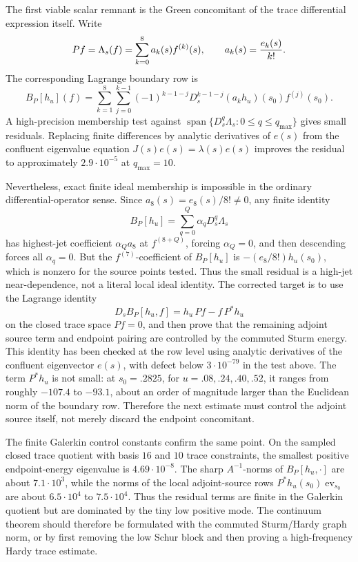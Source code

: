 \documentclass[11pt]{article}
\begin{document}
The first viable scalar remnant is the Green concomitant of the trace
differential expression itself.  Write
\[
  P f=\Lambda_s(f)=\sum_{k=0}^8 a_k(s)f^{(k)}(s),
  \qquad a_k(s)={e_k(s)\over k!}.
\]
The corresponding Lagrange boundary row is
\[
  B_P[h_u](f)=
  \sum_{k=1}^8\sum_{j=0}^{k-1}
    (-1)^{k-1-j} D_s^{k-1-j}(a_kh_u)(s_0)f^{(j)}(s_0).
\]
A high-precision membership test against
\(\operatorname{span}\{D_s^q\Lambda_s:0\le q\le q_{\max}\}\) gives small
residuals.  Replacing finite differences by analytic derivatives of \(e(s)\)
from the confluent eigenvalue equation \(J(s)e(s)=\lambda(s)e(s)\) improves the
residual to approximately \(2.9\cdot10^{-5}\) at \(q_{\max}=10\).

Nevertheless, exact finite ideal membership is impossible in the ordinary
differential-operator sense.  Since \(a_8(s)=e_8(s)/8!\ne0\), any finite
identity
\[
  B_P[h_u]=\sum_{q=0}^Q\alpha_qD_s^q\Lambda_s
\]
has highest-jet coefficient \(\alpha_Qa_8\) at \(f^{(8+Q)}\), forcing
\(\alpha_Q=0\), and then descending forces all \(\alpha_q=0\).  But the
\(f^{(7)}\)-coefficient of \(B_P[h_u]\) is \(-(e_8/8!)h_u(s_0)\), which is
nonzero for the source points tested.  Thus the small residual is a high-jet
near-dependence, not a literal local ideal identity.  The corrected target is
to use the Lagrange identity
\[
  D_s B_P[h_u,f]=h_u\,P f-f\,P^*h_u
\]
on the closed trace space \(P f=0\), and then prove that the remaining adjoint
source term and endpoint pairing are controlled by the commuted Sturm energy.
This identity has been checked at the row level using analytic derivatives of
the confluent eigenvector \(e(s)\), with defect below \(3\cdot10^{-79}\) in the
test above.  The term \(P^*h_u\) is not small: at \(s_0=.2825\), for
\(u=.08,.24,.40,.52\), it ranges from roughly \(-107.4\) to \(-93.1\), about
an order of magnitude larger than the Euclidean norm of the boundary row.
Therefore the next estimate must control the adjoint source itself, not merely
discard the endpoint concomitant.

The finite Galerkin control constants confirm the same point.  On the sampled
closed trace quotient with basis \(16\) and \(10\) trace constraints, the
smallest positive endpoint-energy eigenvalue is \(4.69\cdot10^{-8}\).  The
sharp \(A^{-1}\)-norms of \(B_P[h_u,\cdot]\) are about \(7.1\cdot10^3\), while
the norms of the local adjoint-source rows \(P^*h_u(s_0)\operatorname{ev}_{s_0}\)
are about \(6.5\cdot10^4\) to \(7.5\cdot10^4\).  Thus the residual terms are
finite in the Galerkin quotient but are dominated by the tiny low positive
mode.  The continuum theorem should therefore be formulated with the commuted
Sturm/Hardy graph norm, or by first removing the low Schur block and then
proving a high-frequency Hardy trace estimate.
\end{document}
